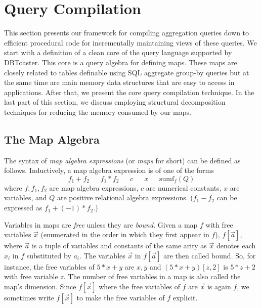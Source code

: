 \section{Query Compilation}


\def\algsum{\mathrm{sum}}
\def\algagg{\mathrm{agg}}
\def\algtop{\mathrm{top}}
\def\algtopk{\mathrm{topk}}



This section presents our framework for compiling aggregation queries down to
efficient procedural code for incrementally maintaining views of these queries.
We start with a definition of a clean
core of the query language supported by DBToaster.
This core is a query algebra for defining maps. These maps are closely related to
tables definable using SQL aggregate group-by queries but at the same time are main
memory data structures that are easy to access in applications.
After that, we present the core query compilation technique.
In the last part of this section, we discuss employing structural decomposition
techniques for reducing the memory consumed by our maps.



\subsection{The Map Algebra}


\def\algsumr{\mbox{sumr}}
\def\algsumf{\mbox{sumf}}
\def\distinct{\mbox{distinct}}
\def\routerjoin{\bowtie\!=}


The syntax of {\em map algebra expressions}\/ (or {\em maps} for short)
can be defined as follows.
Inductively, a map algebra expression is of one of the forms
\[
f_1 + f_2
\quad\;\;
f_1 * f_2
\quad\;\;
c
\quad\;\;
x
\quad\;\;
\algsumf_f(Q)
\]
where $f, f_1, f_2$ are map algebra expressions, $c$ are numerical constants,
$x$ are variables, and $Q$ are positive relational algebra
expressions.
($f_1 - f_2$ can be expressed as $f_1 + (-1) * f_2$.)

Variables in maps are {\em free} unless they are {\em bound}.
Given a map $f$ with free variables $\vec{x}$ (enumerated in the order in which they
first appear in $f$), $f[\vec{a}]$, where $\vec{a}$ is a tuple of variables and constants
of the same arity as $\vec{x}$ denotes each $x_i$ in $f$ substituted by $a_i$. The
variables $\vec{x}$ in $f[\vec{a}]$ are then called bound.
So, for instance, the free variables of $5 * x + y$ are $x,y$ and
$(5 * x + y)[z, 2]$ is $5 * z + 2$ with free variable $z$.
The number of free variables in a map is also called the map's dimension.
Since $f[\vec{x}]$ where the free variables of $f$ are $\vec{x}$ is again $f$, we
sometimes write $f[\vec{x}]$ to make the free variables of $f$ explicit.


